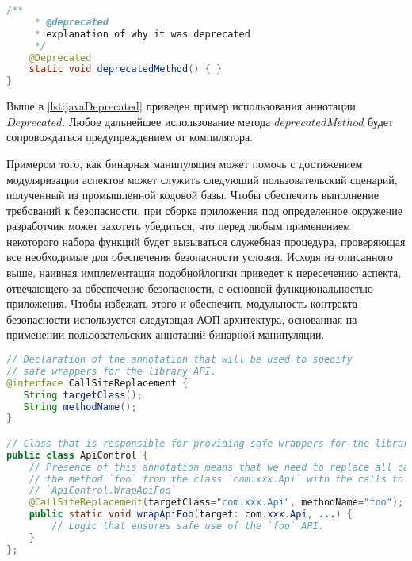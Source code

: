 \begin{lstlisting}[language=Java, caption=Пример использования аннотации $Deprecated$, label=lst:javaDeprecated]
    /**
     * @deprecated
     * explanation of why it was deprecated
     */
    @Deprecated
    static void deprecatedMethod() { }
}
\end{lstlisting}

Выше в \autoref{lst:javaDeprecated} приведен пример использования аннотации $Deprecated$. Любое дальнейшее использование метода $deprecatedMethod$ будет сопровождаться предупреждением от компилятора.

Примером того, как бинарная манипуляция может помочь с достижением модуляризации аспектов может служить следующий пользовательский сценарий, полученный из промышленной кодовой базы. Чтобы обеспечить выполнение требований к безопасности, при сборке приложения под определенное окружение разработчик может захотеть убедиться, что перед любым применением некоторого набора функций будет вызываться служебная процедура, проверяющая все необходимые для обеспечения безопасности условия. Исходя из описанного выше, наивная имплементация подобнойлогики приведет к пересечению аспекта, отвечающего за обеспечение безопасности, с основной функциональностью приложения. Чтобы избежать этого и обеспечить модульность контракта безопасности используется следующая АОП архитектура, основанная на применении пользовательских аннотаций бинарной манипуляции.

\begin{lstlisting}[language=Java, caption=Пример решения задачи замены функции в месте вызова при помощи АОП, label=lst:callSiteAOP]
// Declaration of the annotation that will be used to specify
// safe wrappers for the library API.
@interface CallSiteReplacement {
   String targetClass();
   String methodName();
}

// Class that is responsible for providing safe wrappers for the library API.
public class ApiControl {
    // Presence of this annotation means that we need to replace all calls to
    // the method `foo` from the class `com.xxx.Api` with the calls to
    // `ApiControl.WrapApiFoo`
    @CallSiteReplacement(targetClass="com.xxx.Api", methodName="foo");
    public static void wrapApiFoo(target: com.xxx.Api, ...) {
        // Logic that ensures safe use of the `foo` API.
    }
};
\end{lstlisting}

